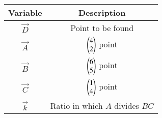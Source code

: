 \begin{tabular}[12pt]{ |c| |c|}
    \hline
    \textbf{Variable} & \textbf{Description}\\ 
    \hline
	$\vec{D}$  & Point to be found\\
    \hline
     $\vec{A}$ &  $\begin{pmatrix}4 \\ 2\end{pmatrix}$  point\\
    \hline
    $ \vec{B}$  &  $\begin{pmatrix}6 \\ 5\end{pmatrix}$  point\\
    \hline
     $\vec{C}$ & $\begin{pmatrix}1 \\ 4\end{pmatrix} $ point\\
	\hline
    $ \vec{k}$  & Ratio in which $ A $ divides $BC$
    \hline
\end{tabular}
